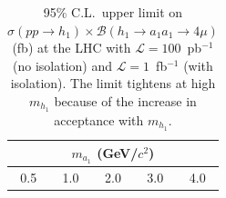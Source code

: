 \documentclass[aps,prl,twocolumn,nofootinbib,superscriptaddress]{revtex4}
\begin{document}
\begin{table}[htbp]
\caption{95\% C.L.\ upper limit on $\sigma(pp \to h_1) \times
  \mathcal{B}(h_1 \to a_1 a_1 \to 4\mu)$ (fb) at the LHC with
  $\mathcal{L} = 100$~pb$^{-1}$ (no isolation) and $\mathcal{L} =
  1$~fb$^{-1}$ (with isolation).  The limit tightens at high $m_{h_1}$
  because of the increase in acceptance with
  $m_{h_1}$. \label{table_both_factorized}}

\begin{flushright}
\renewcommand{\arraystretch}{1.4}
\begin{tabular}{c | c | c | c | c}
\hline\hline
\multicolumn{5}{c}{$m_{a_1}$ (GeV/$c^2$)} \\
\hline
\mbox{\hspace{0.19 cm}}0.5\mbox{\hspace{0.19 cm}} & \mbox{\hspace{0.25 cm}}1.0\mbox{\hspace{0.25 cm}} & \mbox{\hspace{0.34 cm}}2.0\mbox{\hspace{0.34 cm}} & \mbox{\hspace{0.33 cm}}3.0\mbox{\hspace{0.33 cm}} & \mbox{\hspace{0.25 cm}}4.0\mbox{\hspace{0.25 cm}} \\
\end{tabular}


\end{flushright}
\end{table}
\end{document}
